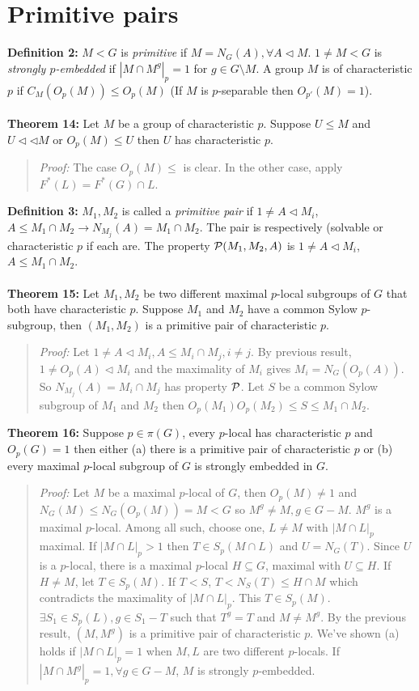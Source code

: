 \section {Primitive pairs}
{\bf Definition 2:} $M<G$ is \emph{primitive} if $M=N_G(A), \forall A \lhd M$. $1 \ne M <G$ is
\emph{strongly $p$-embedded} if $|M \cap M^g|_p = 1$ for $g \in G \setminus M$.
A group $M$ is of characteristic $p$ if $C_M(O_p(M)) \leq O_p(M)$ (If
$M$ is $p$-separable then $O_{p'}(M)=1$).
\\
\\
{\bf Theorem 14:}
Let $M$ be a group of characteristic $p$.
Suppose $U \le M$ and $U \lhd \lhd M$ or $O_p(M) \le U$ then
$U$ has characteristic $p$.
\begin{quote}
\emph{Proof:}
The case $O_p(M) \leq $ is clear.  In the other case, apply $F^*(L) =F^*(G) \cap L$.
\end{quote}
{\bf Definition 3:}  $M_1, M_2$ is called a \emph{primitive pair} if $1 \ne A \lhd M_i$,
$A \le M_1 \cap M_2 \rightarrow N_{M_j}(A)= M_1 \cap M_2$.  The pair is respectively
(solvable or characteristic $p$ if each are.  The property ${\cal P}(M_1 , M_2, A)$ is
$1 \neq A \lhd M_i$, $A \leq M_1 \cap M_2$.
\\
\\
{\bf Theorem 15:}
Let $M_1, M_2$ be two different maximal $p$-local subgroups of $G$ that both have characteristic $p$.
Suppose $M_1$ and $M_2$ have a common Sylow $p$-subgroup, then $(M_1 , M_2)$ is a primitive pair of characteristic $p$.
\begin{quote}
\emph{Proof:}  Let $1 \neq A \lhd M_i, A \leq M_i \cap M_j, i \neq j$.  By previous result,
$1 \neq O_p(A) \lhd M_i$ and the maximality of $M_i$ gives $M_i= N_G(O_p(A))$.  So
$N_{M_j}(A)= M_i \cap M_j$ has property ${\cal P}$.  Let $S$ be a common Sylow subgroup of
$M_1$ and $M_2$ then $O_p(M_1 ) O_p(M_2 ) \leq S \leq M_1 \cap M_2$.
\end{quote}
{\bf Theorem 16:}
Suppose $p \in \pi(G)$, every $p$-local has characteristic $p$ and $O_p(G)=1$ then either
(a) there is a primitive pair of characteristic $p$ or (b)
every maximal $p$-local subgroup of $G$ is strongly embedded in $G$.
\begin{quote}
\emph{Proof:}  Let $M$ be a maximal $p$-local of $G$, then $O_p(M) \neq 1$ and
$N_G(M) \leq N_G(O_p(M))=M < G$ so $M^g \neq M, g \in G-M$.  $M^g$ is a maximal $p$-local.
Among all such, choose one, $L \neq M$ with $|M \cap L|_p$ maximal.
If $|M \cap L|_p>1$ then $T \in S_p(M \cap L)$ and $U= N_G(T)$.
Since $U$ is a $p$-local, there is a maximal $p$-local $H \subseteq G$, maximal with $U \subseteq H$.
If $H \neq M$, let $T \in S_p(M)$.  If $T<S$, $T<N_S(T) \leq H \cap M$ which contradicts the maximality of
$|M \cap L|_p$.  This $T \in S_p(M)$.  $\exists S_1 \in S_p(L), g \in S_1 - T$ such that $T^g=T$ and
$M \neq M^g$.  By the previous result, $(M, M^g)$ is a primitive pair of characteristic $p$.  We've shown (a)
holds if $|M \cap L|_p = 1$ when $M, L$ are two different $p$-locals.   If $|M \cap M^g|_p=1, \forall g \in G - M$,
$M$ is strongly $p$-embedded.
\end{quote}
